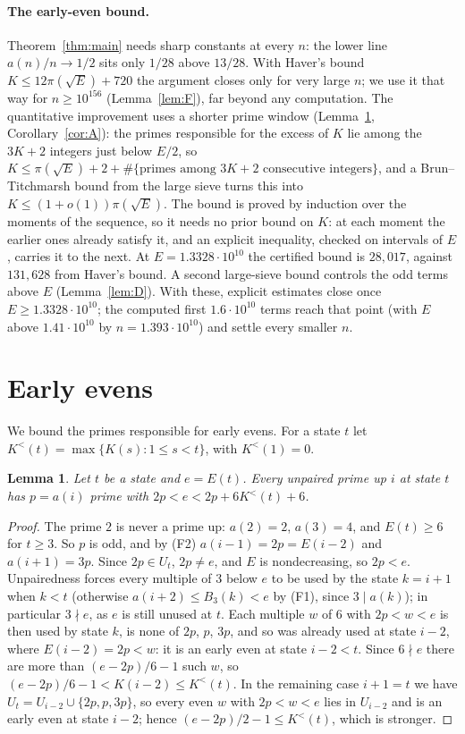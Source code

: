 \documentclass[11pt]{article}
\newtheorem{lemma}[theorem]{Lemma}
\theoremstyle{definition}
\theoremstyle{remark}
\newcommand{\U}{U}
\begin{document}
\paragraph{The early-even bound.}
Theorem~\ref{thm:main} needs sharp constants at every $n$: the lower line
$a(n)/n\to1/2$ sits only $1/28$ above $13/28$. With Haver's bound
$K\le12\pi(\sqrt E)+720$ \cite[Theorem~5]{haver} the argument closes
only for very large $n$; we use it that way for $n\ge10^{156}$
(Lemma~\ref{lem:F}), far beyond any computation.
The quantitative improvement uses a shorter prime window
(Lemma~\ref{lem:A}, Corollary~\ref{cor:A}): the primes responsible for
the excess of $K$ lie among the $3K+2$ integers just below $E/2$, so
$K\le\pi(\sqrt E)+2+\#\{\text{primes among }3K+2\text{ consecutive integers}\}$, and a
Brun--Titchmarsh bound from the large sieve turns this into
$K\le(1+o(1))\pi(\sqrt E)$. The bound is proved by induction over the
moments of the sequence, so it needs no prior bound on $K$: at each moment
the earlier ones already satisfy it, and an explicit inequality, checked
on intervals of $E$, carries it to the next. At $E=1.3328\cdot10^{10}$
the certified bound is $28{,}017$, against $131{,}628$ from Haver's bound.
A second
large-sieve bound controls the odd terms above $E$ (Lemma~\ref{lem:D}).
With these, explicit estimates close once $E\ge1.3328\cdot10^{10}$; the
computed first $1.6\cdot10^{10}$ terms reach that point (with $E$ above
$1.41\cdot10^{10}$ by $n=1.393\cdot10^{10}$) and settle every smaller $n$.

\section{Early evens}\label{sec:K}

We bound the primes responsible for early evens. For a state $t$ let
$K^{<}(t)=\max\{K(s):1\le s<t\}$, with $K^{<}(1)=0$.

\begin{lemma}\label{lem:A}
Let $t$ be a state and $e=E(t)$. Every unpaired prime up $i$ at state $t$
has $p=a(i)$ prime with $2p<e<2p+6K^{<}(t)+6$.
\end{lemma}

\begin{proof}
The prime $2$ is never a prime up: $a(2)=2$, $a(3)=4$, and $E(t)\ge6$
for $t\ge3$. So $p$ is odd, and by (F2)
$a(i-1)=2p=E(i-2)$ and $a(i+1)=3p$. Since $2p\in\U_t$, $2p\ne e$,
and $E$ is nondecreasing, so $2p<e$. Unpairedness forces every multiple
of $3$ below $e$ to be used by the state $k=i+1$ when $k<t$ (otherwise
$a(i+2)\le B_3(k)<e$ by (F1), since $3\mid a(k)$); in particular $3\nmid e$,
as $e$ is still unused at $t$. Each multiple $w$ of $6$ with $2p<w<e$ is
then used by state $k$, is none of $2p$, $p$, $3p$, and so was already
used at state $i-2$, where $E(i-2)=2p<w$: it is an early even at state
$i-2<t$. Since $6\nmid e$ there are more than $(e-2p)/6-1$ such $w$, so
$(e-2p)/6-1<K(i-2)\le K^{<}(t)$. In the remaining case $i+1=t$ we have
$\U_t=\U_{i-2}\cup\{2p,p,3p\}$, so every even $w$ with $2p<w<e$ lies in
$\U_{i-2}$ and is an early even at state $i-2$; hence
$(e-2p)/2-1\le K^{<}(t)$, which is stronger.
\end{proof}
\end{document}
